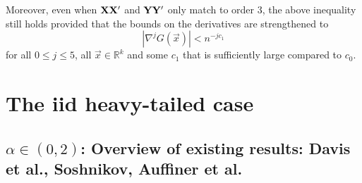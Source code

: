 \documentclass[11pt,reqno]{amsart}
\newcommand{\1}{\mathds{1}}
\newcommand{\0}{\boldsymbol{0}}
\newcommand{\4}{\mathchoice{\mskip1.5mu}{\mskip1.5mu}{}{}}
\newcommand{\5}{\mathchoice{\mskip-1.5mu}{\mskip-1.5mu}{}{}}
\newcommand{\2}{\penalty250\mskip\thickmuskip\mskip-\thinmuskip} %
\begin{document}
Moreover, even when ${\bf XX'}$ and ${\bf YY'}$ only match to order
3, the above inequality still holds provided that the bounds on the
derivatives are strengthened to
\[
|\nabla^j G(\vec x)| < n^{-j c_1}
\]
for all $0 \leq j \leq 5$, all $\vec x \in \mathbb R^k$ and some $c_1$
that is sufficiently large compared to $c_0$.

\section{The iid heavy-tailed case}

\subsection{$\alpha \in (0,2)$: Overview of existing results: Davis et
  al., Soshnikov, Auffiner et al.}
\end{document}
